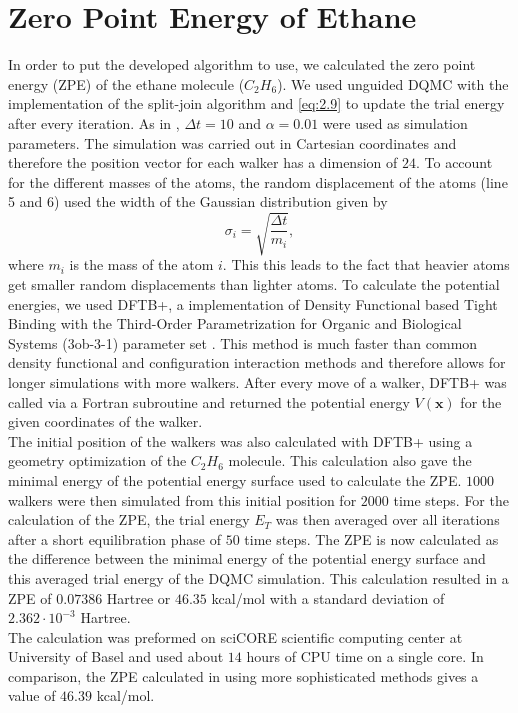 \documentclass [12pt]{report}
\begin{document}
\section{Zero Point Energy of Ethane}
In order to put the developed algorithm to use, we calculated the zero point energy (ZPE) of the ethane molecule ($C_{2}H_{6}$). We used unguided DQMC with the implementation of the split-join algorithm and \eqref{eq:2.9} to update the trial energy after every iteration. As in \cite{mccoy}, $\Delta t = 10$ and $\alpha = 0.01$ were used as simulation parameters. The simulation was carried out in Cartesian coordinates and therefore the position vector for each walker has a dimension of $24$. To account for the different masses of the atoms, the random displacement of the atoms (line 5 and 6) used the width of the Gaussian distribution given by 
\begin{equation}\label{eq:3.6} 
\sigma_i = \sqrt{\frac{\Delta t}{m_i}},
\end{equation}
where $m_i$ is the mass of the atom $i$. This this leads to the fact that heavier atoms get smaller random displacements than lighter atoms. To calculate the potential energies, we used DFTB+, a implementation of Density Functional based Tight Binding \cite{dftbp} with the Third-Order Parametrization for Organic and Biological Systems (3ob-3-1) parameter set \cite{3ob-3-1}. This method is much faster than common density functional and configuration interaction methods and therefore allows for longer simulations with more walkers. After every move of a walker, DFTB+ was called via a Fortran subroutine and returned the potential energy $V(\bm{x})$ for the given coordinates of the walker.\\
The initial position of the walkers was also calculated with DFTB+ using a geometry optimization of the $C_{2}H_{6}$ molecule. This calculation also gave the minimal energy of the potential energy surface used to calculate the ZPE. $1000$ walkers were then simulated from this initial position for $2000$ time steps. For the calculation of the ZPE, the trial energy $E_T$ was then averaged over all iterations after a short equilibration phase of $50$ time steps. The ZPE is now calculated as the difference between the minimal energy of the potential energy surface and this averaged trial energy of the DQMC simulation. This calculation resulted in a ZPE of $0.07386$ Hartree or $46.35$ kcal/mol with a standard deviation of $2.362 \cdot 10^{-3}$ Hartree.\\
The calculation was preformed on sciCORE scientific computing center at University of Basel \cite{http://scicore.unibas.ch/} and used about $14$ hours of CPU time on a single core. In comparison, the ZPE calculated in \cite{c2h6} using more sophisticated methods gives a value of $46.39$ kcal/mol.
\end{document}
